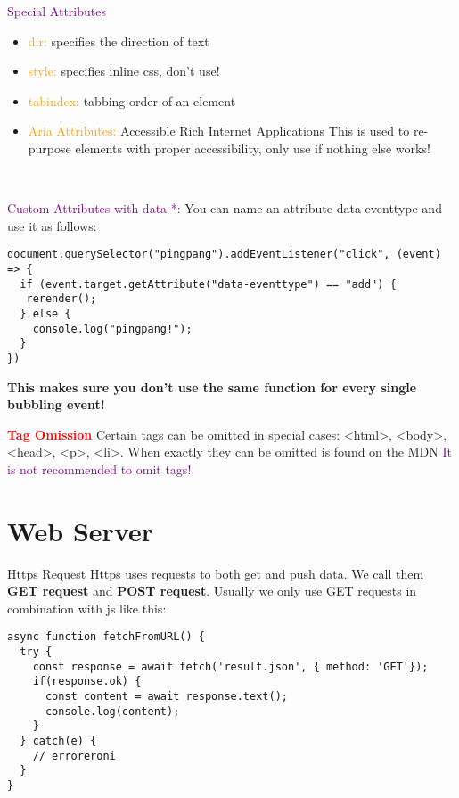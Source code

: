\documentclass[main.tex,fontsize=6pt,paper=a4,paper=landscape,DIV=calc,]{scrartcl}
\begin{document}
\begin{multicols*}{4}
\textcolor{purple}{Special Attributes}
\begin{itemize}
\item \textcolor{orange}{dir:} specifies the direction of text
\item \textcolor{orange}{style:} specifies inline css, don't use!
\item \textcolor{orange}{tabindex:} tabbing order of an element
\item \textcolor{orange}{Aria Attributes:} Accessible Rich Internet Applications\newline
  This is used to re-purpose elements with proper accessibility, only use if nothing else works!
\end{itemize} 
\, \newline

\textcolor{purple}{Custom Attributes with data-*:}\newline
You can name an attribute data-eventtype and use it as follows:
\vspace{-2mm}
\begin{lstlisting}
document.querySelector("pingpang").addEventListener("click", (event) => { 
  if (event.target.getAttribute("data-eventtype") == "add") {
   rerender();
  } else {
    console.log("pingpang!");
  }
})
\end{lstlisting}
\vspace{2mm}
\textbf{This makes sure you don't use the same function for every single bubbling event!}\newline
\, \newline

\textbf{\textcolor{red}{Tag Omission}}\newline 
Certain tags can be omitted in special cases:\newline
<html>, <body>, <head>, <p>, <li>.\newline
When exactly they can be omitted is found on the MDN\newline
\textcolor{purple}{It is not recommended to omit tags!}







\section{Web Server}


Https Request  
Https uses requests to both get and push data.\newline
We call them \textbf{GET request} and \textbf{POST request}.\newline
Usually we only use GET requests in combination with js like this:\newline
\vspace{-2mm}
\begin{lstlisting}
async function fetchFromURL() {
  try {
    const response = await fetch('result.json', { method: 'GET'});
    if(response.ok) {
      const content = await response.text();
      console.log(content);
    }
  } catch(e) {
    // erroreroni
  }
}
\end{lstlisting}
\vspace{2mm}


\end{multicols*}
\end{document}
